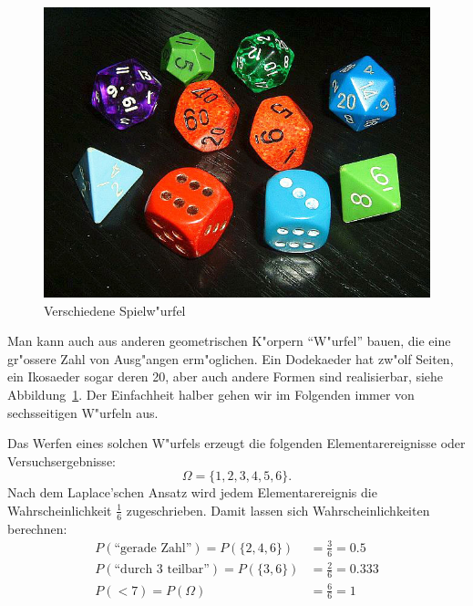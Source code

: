 \begin{figure}
\begin{center}
\includegraphics[width=0.8\hsize]{graphics/Wuerfel5}
\end{center}
\caption{Verschiedene Spielw"urfel\label{bild-spielwuerfel}}
\end{figure}
Man kann auch aus anderen geometrischen K"orpern ``W"urfel'' bauen, die
eine gr"ossere Zahl von Ausg"angen erm"oglichen.
Ein Dodekaeder hat
zw"olf Seiten, ein Ikosaeder sogar deren 20, aber auch andere Formen
sind realisierbar, siehe Abbildung~\ref{bild-spielwuerfel}.
Der Einfachheit
halber gehen wir im Folgenden immer von sechsseitigen W"urfeln aus.

Das Werfen eines solchen W"urfels erzeugt die folgenden Elementarereignisse
oder Versuchsergebnisse:
\[
\Omega=\{1,2,3,4,5,6\}.
\]
Nach dem Laplace'schen Ansatz wird jedem Elementarereignis die
Wahrscheinlichkeit $\frac16$ zugeschrieben.
Damit lassen sich
Wahrscheinlichkeiten berechnen:
\begin{align*}
P(\text{``gerade Zahl''})=P(\{2,4,6\})&=\frac36=0.5\\
P(\text{``durch 3 teilbar''})=P(\{3,6\})&=\frac26=0.333\\
P(< 7)=P(\Omega)&=\frac66=1
\end{align*}

